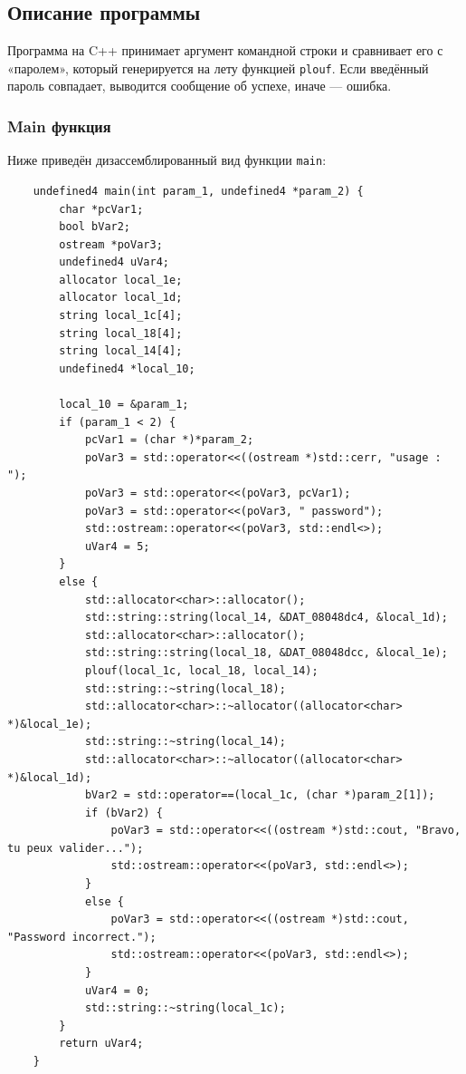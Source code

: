     \subsection{Описание программы}

    Программа на C++ принимает аргумент командной строки и сравнивает его с «паролем»,
    который генерируется на лету функцией \texttt{plouf}.
    Если введённый пароль совпадает, выводится сообщение об успехе, иначе — ошибка.

    \subsubsection{Main функция}

    Ниже приведён дизассемблированный вид функции \texttt{main}:

    \begin{verbatim}
    undefined4 main(int param_1, undefined4 *param_2) {
        char *pcVar1;
        bool bVar2;
        ostream *poVar3;
        undefined4 uVar4;
        allocator local_1e;
        allocator local_1d;
        string local_1c[4];
        string local_18[4];
        string local_14[4];
        undefined4 *local_10;

        local_10 = &param_1;
        if (param_1 < 2) {
            pcVar1 = (char *)*param_2;
            poVar3 = std::operator<<((ostream *)std::cerr, "usage : ");
            poVar3 = std::operator<<(poVar3, pcVar1);
            poVar3 = std::operator<<(poVar3, " password");
            std::ostream::operator<<(poVar3, std::endl<>);
            uVar4 = 5;
        }
        else {
            std::allocator<char>::allocator();
            std::string::string(local_14, &DAT_08048dc4, &local_1d);
            std::allocator<char>::allocator();
            std::string::string(local_18, &DAT_08048dcc, &local_1e);
            plouf(local_1c, local_18, local_14);
            std::string::~string(local_18);
            std::allocator<char>::~allocator((allocator<char> *)&local_1e);
            std::string::~string(local_14);
            std::allocator<char>::~allocator((allocator<char> *)&local_1d);
            bVar2 = std::operator==(local_1c, (char *)param_2[1]);
            if (bVar2) {
                poVar3 = std::operator<<((ostream *)std::cout, "Bravo, tu peux valider...");
                std::ostream::operator<<(poVar3, std::endl<>);
            }
            else {
                poVar3 = std::operator<<((ostream *)std::cout, "Password incorrect.");
                std::ostream::operator<<(poVar3, std::endl<>);
            }
            uVar4 = 0;
            std::string::~string(local_1c);
        }
        return uVar4;
    }
    \end{verbatim}

